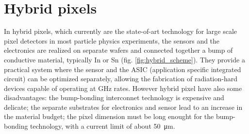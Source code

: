 \section{Hybrid pixels}
   In hybrid pixels, which currently are the state-of-art technology for large scale pixel detectors in most particle physics experiments, the sensors and the electronics are realized on separate wafers and connected together a bump of conductive material, typically In or Sn  (fig. \ref{fig:hybrid_scheme}). 
   They provide a practical system where the sensor and the ASIC (application specific integrated circuit) can be optimized separately, allowing the fabrication of radiation-hard devices capable of operating at \si{GHz} rates.
   However hybrid pixel have also some disadvantages: the bump-bonding interconnet technology is expensive and delicate; the separate substrates for electronics and sensor lead to an increase in the material budget; the pixel dimension must be long enought for the bump-bonding technology, with a current limit of about \SI{50}{\um}.

